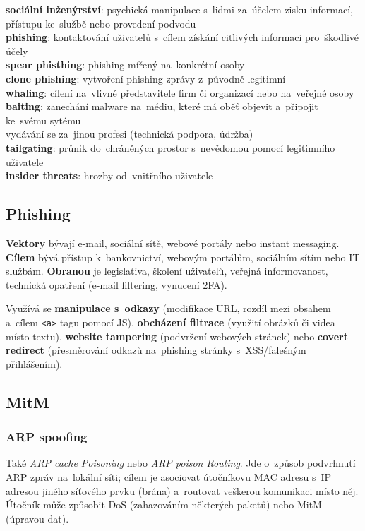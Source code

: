 \textbf{sociální inženýrství}: psychická manipulace s~lidmi za~účelem zisku informací, přístupu ke~službě nebo provedení podvodu \\
\textbf{phishing}: kontaktování uživatelů s~cílem získání citlivých informaci pro~škodlivé účely \\
\textbf{spear phisthing}: phishing mířený na~konkrétní osoby \\
\textbf{clone phishing}: vytvoření phishing zprávy z~původně legitimní \\
\textbf{whaling}: cílení na~vlivné představitele firm či organizací nebo na~veřejné osoby \\
\textbf{baiting}: zanechání malware na~médiu, které má oběť objevit a~připojit ke~svému sytému \\
vydávání se za~jinou profesi (technická podpora, údržba) \\
\textbf{tailgating}: průnik do~chráněných prostor s~nevědomou pomocí legitimního uživatele \\
\textbf{insider threats}: hrozby od~vnitřního uživatele

\subsection*{Phishing}

\textbf{Vektory} bývají e-mail, sociální sítě, webové portály nebo instant messaging. \textbf{Cílem} bývá přístup k~bankovnictví, webovým portálům, sociálním sítím nebo IT službám. \textbf{Obranou} je legislativa, školení uživatelů, veřejná informovanost, technická opatření (e-mail filtering, vynucení 2FA).

Využívá se \textbf{manipulace s~odkazy} (modifikace URL, rozdíl mezi obsahem a~cílem \texttt{<a>} tagu pomocí JS), \textbf{obcházení filtrace} (využití obrázků či videa místo textu), \textbf{website tampering} (podvržení webových stránek) nebo \textbf{covert redirect} (přesměrování odkazů na~phishing stránky s~XSS/falešným přihlášením).

\subsection{MitM}

\subsubsection{ARP spoofing}

Také \emph{ARP cache Poisoning} nebo \emph{ARP poison Routing}. Jde o~způsob podvrhnutí ARP zpráv na~lokální síti; cílem je asociovat útočníkovu MAC adresu s~IP adresou jiného síťového prvku (brána) a~routovat veškerou komunikaci místo něj. Útočník může způsobit DoS (zahazováním některých paketů) nebo MitM (úpravou dat).

